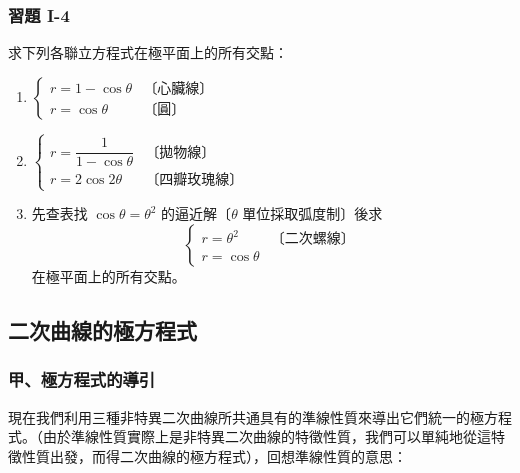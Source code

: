 \medskip
\subsubsection*{習題 I-4}\label{sec:b5s-ex1-4}

求下列各聯立方程式在極平面上的所有交點：

\begin{enumerate}[label=\arabic*., leftmargin=2em]
\item $\begin{cases} r = 1 - \cos\theta & \text{〔心臟線〕} \\[4pt] r = \cos\theta & \text{〔圓〕} \end{cases}$
\item $\begin{cases} r = \dfrac{1}{1 - \cos\theta} & \text{〔拋物線〕} \\[8pt] r = 2\cos 2\theta & \text{〔四瓣玫瑰線〕} \end{cases}$
\item 先查表找 $\cos\theta = \theta^2$ 的逼近解〔$\theta$ 單位採取弧度制〕後求
\[
\begin{cases}
r = \theta^2 & \text{〔二次螺線〕} \\[4pt]
r = \cos\theta
\end{cases}
\]
在極平面上的所有交點。
\end{enumerate}

\subsection{二次曲線的極方程式}
\label{sec:b5s-1-5}

\subsubsection*{甲、極方程式的導引}

現在我們利用三種非特異二次曲線所共通具有的準線性質來導出它們統一的極方程式。（由於準線性質實際上是非特異二次曲線的特徵性質，我們可以單純地從這特徵性質出發，而得二次曲線的極方程式），回想準線性質的意思：

